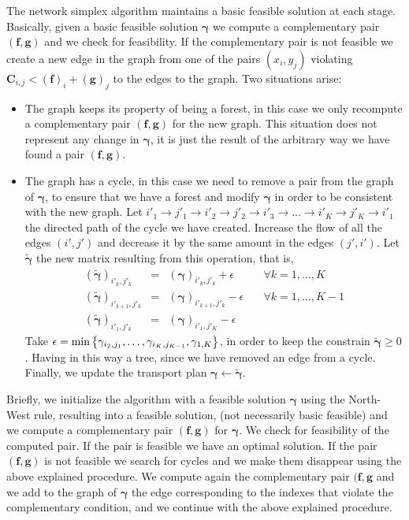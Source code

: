 The network simplex algorithm maintains a basic feasible solution at each stage. Basically, given a basic feasible solution $\pmb{\gamma}$ we compute a complementary pair $(\mathbf{f},\mathbf{g})$ and we check for feasibility. If the complementary pair is not feasible we create a new edge in the graph from one of the pairs $(x_i,y_j)$ violating $\mathbf{C}_{i,j}<(\mathbf{f})_i+(\mathbf{g})_j$ to the edges to the graph. Two situations arise:
\begin{itemize}
	\item The graph keeps its property of being a forest, in this case we only recompute a complementary pair $(\mathbf{f}, \mathbf{g})$ for the new graph. This situation does not represent any change in $\pmb{\gamma}$, it is just the result of the arbitrary way we have found a pair $(\mathbf{f}, \mathbf{g})$.
	\item The graph has a cycle, in this case we need to remove a pair from the graph of $\pmb{\gamma}$, to ensure that we have a forest and modify $\pmb{\gamma}$ in order to be consistent with the new graph. 
	Let $i'_1\to j'_1\to i'_2\to j'_2\to i'_3\to\dots\to i'_K\to j'_K\to i'_1$ the directed path of the cycle we have created. Increase the flow of all the edges $(i', j')$ and decrease it by the same amount in the edges $(j',i')$.
	Let $\tilde{\pmb{\gamma}}$ the new matrix resulting from this operation, that is,
	\begin{equation*}
		\begin{array}{lclc}
		(\tilde{\pmb{\gamma}})_{i'_k,j'_k}&=&({\pmb{\gamma}})_{i'_k,j'_k}+\epsilon&\quad \forall k=1,\dots, K\\
		(\tilde{\pmb{\gamma}})_{i'_{k+1}, j'_k}&=&({\pmb{\gamma}})_{i'_{k+1},j'_{k}}-\epsilon&\quad \forall k=1,\dots,K-1 \\
		(\tilde{\pmb{\gamma}})_{i'_1, j'_k}&=&({\pmb{\gamma}})_{i'_1,j'_{K}}-\epsilon&
		\end{array}
	\end{equation*}
	Take $\epsilon=\min\left\lbrace \gamma_{i_{2}, j_{1}},\dots, \gamma_{i_{K}, j_{K-1}},\gamma_{1,K} \right\rbrace$, in order to keep the constrain $\tilde{\pmb{\gamma}}\geq 0$. Having in this way a tree, since we have removed an edge from a cycle. Finally, we update the transport plan $\pmb{\gamma}\leftarrow\tilde{\pmb{\gamma}}$.
\end{itemize}
Briefly, we initialize the algorithm with a feasible solution $\pmb{\gamma}$ using the North-West rule, resulting into a feasible solution, (not necessarily basic feasible) and we compute a complementary pair $(\mathbf{f},\mathbf{g})$ for $\pmb{\gamma}$. We check for feasibility of the computed pair. If the pair is feasible we have an optimal solution. If the pair $(\mathbf{f},\mathbf{g})$ is not feasible we search for cycles and we make them disappear using the above explained procedure. We compute again the complementary pair $(\mathbf{f}, \mathbf{g}$  and we add to the graph of $\pmb{\gamma}$ the edge corresponding to the indexes that violate the complementary condition, and we continue with the above explained procedure. 

